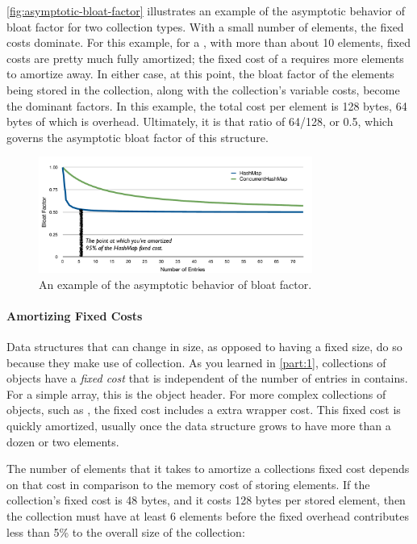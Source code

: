 \autoref{fig:asymptotic-bloat-factor} illustrates an example of the asymptotic
behavior of bloat factor for two collection types. With a small number of
elements, the fixed costs dominate. For this example, for a ,
with more than about 10 elements, fixed costs are pretty much fully amortized;
the fixed cost of a  requires more elements to amortize
away. In either case, at this point, the bloat factor of the elements being
stored in the collection, along with the collection's variable costs, become the
dominant factors. In this example, the total cost per element is 128 bytes, 64
bytes of which is overhead. Ultimately, it is that ratio of 64/128, or 0.5,
which governs the asymptotic bloat factor of this structure.


\begin{figure}
\centering
\includegraphics[width=0.8\textwidth]{part3/Figures/assessing/asymptote}
\caption{An example of the asymptotic behavior of bloat factor.}
\label{fig:asymptotic-bloat-factor}
\end{figure}

\paragraph{Amortizing Fixed Costs}
Data structures that can change in size, as opposed to having a fixed size,  do
so because they make use of collection. As you learned in \autoref{part:1},
collections of objects have a \emph{fixed cost} that is independent of the
number of entries in contains. For a simple array, this is the \jre object
header. For more complex collections of objects, such as
, the fixed cost includes a extra wrapper cost. This
fixed cost is quickly amortized, usually once the data structure grows to have
more than a dozen or two elements.

The number of elements that it takes to amortize a collections fixed cost
depends on that cost in comparison to the memory cost of storing elements. If
the collection's fixed cost is 48 bytes, and it costs 128 bytes per stored
element, then the collection must have at least 6 elements before the fixed
overhead contributes less than 5\% to the overall size of the collection:

